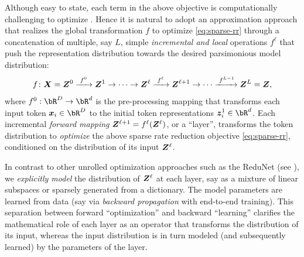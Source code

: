 \documentclass[../../book-main.tex]{subfiles}
\begin{document}
Although easy to state, each term in the above objective is computationally challenging to optimize \cite{Wright-Ma-2022}. Hence it is natural to adopt an approximation approach that realizes the global transformation $f$ to optimize 
\eqref{eq:sparse-rr} through a concatenation of multiple, say $L$, simple \textit{incremental and local} operations $f^\ell$ that push the representation distribution towards the desired parsimonious model distribution:
\begin{equation}
f\colon \bm{X} = \bm Z^0 \xrightarrow{\hspace{1mm} f^0 \hspace{1mm}} \bm{Z}^1 \rightarrow \cdots \rightarrow \bm{Z}^\ell \xrightarrow{\hspace{1mm} f^{\ell} \hspace{1mm}} \bm{Z}^{\ell+1} \rightarrow  \cdots \xrightarrow{\hspace{1mm} f^{L-1}} \bm{Z}^L = \bm{Z},
\label{eq:incremental}
\end{equation}
where $f^0: \bR^{D} \rightarrow \bR^{d}$ is the pre-processing mapping that transforms each input token $\x_{i} \in \bR^{D}$ to the initial token representations $\z_{i}^{1} \in \bR^{d}$.  
Each incremental \textit{forward mapping} $\bm{Z}^{\ell + 1} = f^\ell(\bm{Z}^\ell)$, or a ``layer'', transforms the token distribution to \textit{optimize} the above sparse rate reduction objective \eqref{eq:sparse-rr}, conditioned on the distribution of its input $\bm{Z}^\ell$. 

\begin{remark}
    In contrast to other unrolled optimization approaches such as the ReduNet (see ), we \textit{explicitly model} the distribution of $\bm{Z}^\ell$ at each layer, say as a mixture of linear subspaces or sparsely generated from a dictionary. The model parameters are learned from data (say via \textit{backward propagation} with end-to-end training). This separation between forward ``optimization'' and backward
``learning'' clarifies the mathematical role of each layer as an operator
that transforms the distribution of its input, whereas the input distribution is in turn modeled (and subsequently learned) by the parameters of the layer. 
\end{remark}
\end{document}
